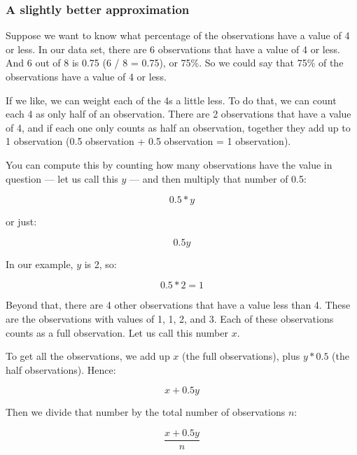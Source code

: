\documentclass[../../../main.tex]{subfiles}
\begin{document}
\subsubsection{A slightly better approximation}

Suppose we want to know what percentage of the observations have a value of 4 or less. In our data set, there are 6 observations that have a value of 4 or less. And 6 out of 8 is 0.75 (6 / 8 = 0.75), or 75\%. So we could say that 75\% of the observations have a value of 4 or less.

If we like, we can weight each of the 4s a little less. To do that, we can count each 4 as only half of an observation. There are 2 observations that have a value of 4, and if each one only counts as half an observation, together they add up to 1 observation (0.5 observation + 0.5 observation = 1 observation).

You can compute this by counting how many observations have the value in question --- let us call this $y$ --- and then multiply that number of 0.5:

\begin{equation*}
  0.5 * y 
\end{equation*}

\noindent
or just:

\begin{equation*}
  0.5y
\end{equation*}

In our example, $y$ is 2, so:

\begin{equation*}
  0.5 * 2 = 1
\end{equation*}

\noindent
Beyond that, there are 4 other observations that have a value less than 4. These are the observations with values of 1, 1, 2, and 3. Each of these observations counts as a full observation. Let us call this number $x$.

To get all the observations, we add up $x$ (the full observations), plus $y * 0.5$ (the half observations). Hence:

\begin{equation*}
  x + 0.5y
\end{equation*}

\noindent
Then we divide that number by the total number of observations $n$:

\begin{equation*}
  \frac{x + 0.5y}{n}
\end{equation*}
\end{document}

